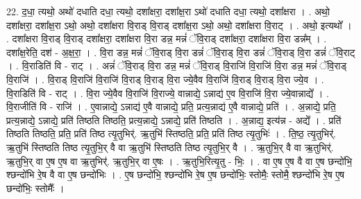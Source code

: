 \documentclass[17pt]{extarticle}
\begin{document}
22. द॒धा॒ त्यथो॒ अथो॑ दधाति दधा॒ त्यथो॒ दशा᳚क्षरा॒ दशा᳚क्ष॒रा ऽथो॑ दधाति दधा॒ त्यथो॒ दशा᳚क्षरा । . अथो॒ दशा᳚क्षरा॒ दशा᳚क्ष॒रा ऽथो॒ अथो॒ दशा᳚क्षरा वि॒राड् वि॒राड् दशा᳚क्ष॒रा ऽथो॒ अथो॒ दशा᳚क्षरा वि॒राट् । . अथो॒ इत्यथो᳚ । . दशा᳚क्षरा वि॒राड् वि॒राड् दशा᳚क्षरा॒ दशा᳚क्षरा वि॒रा डन्न॒ मन्नं॑ ॅवि॒राड् दशा᳚क्षरा॒ दशा᳚क्षरा वि॒रा डन्न᳚म् । . दशा᳚क्ष॒रेति॒ दश॑ - अ॒क्ष॒रा॒ । . वि॒रा डन्न॒ मन्नं॑ ॅवि॒राड् वि॒रा डन्नं॑ ॅवि॒राड् वि॒रा डन्नं॑ ॅवि॒राड् वि॒रा डन्नं॑ ॅवि॒राट् । . वि॒राडिति॑ वि - राट् । . अन्नं॑ ॅवि॒राड् वि॒रा डन्न॒ मन्नं॑ ॅवि॒राड् वि॒राजि॑ वि॒राजि॑ वि॒रा डन्न॒ मन्नं॑ ॅवि॒राड् वि॒राजि॑ । . वि॒राड् वि॒राजि॑ वि॒राजि॑ वि॒राड् वि॒राड् वि॒रा ज्ये॒वैव वि॒राजि॑ वि॒राड् वि॒राड् वि॒रा ज्ये॒व । . वि॒राडिति॑ वि - राट् । . वि॒रा ज्ये॒वैव वि॒राजि॑ वि॒राज्ये॒ वान्नाद्ये॒ ऽन्नाद्य॑ ए॒व वि॒राजि॑ वि॒रा ज्ये॒वान्नाद्ये᳚ । . वि॒राजीति॑ वि - राजि॑ । . ए॒वान्नाद्ये॒ ऽन्नाद्य॑ ए॒वै वान्नाद्ये॒ प्रति॒ प्रत्य॒न्नाद्य॑ ए॒वै वान्नाद्ये॒ प्रति॑ । . अ॒न्नाद्ये॒ प्रति॒ प्रत्य॒न्नाद्ये॒ ऽन्नाद्ये॒ प्रति॑ तिष्ठति तिष्ठति॒ प्रत्य॒न्नाद्ये॒ ऽन्नाद्ये॒ प्रति॑ तिष्ठति । . अ॒न्नाद्य॒ इत्य॑न्न - अद्ये᳚ । . प्रति॑ तिष्ठति तिष्ठति॒ प्रति॒ प्रति॑ तिष्ठ त्यृ॒तुभिर्॑. ऋ॒तुभि॑ स्तिष्ठति॒ प्रति॒ प्रति॑ तिष्ठ त्यृ॒तुभिः॑ । . ति॒ष्ठ॒ त्यृ॒तुभिर्॑. ऋ॒तुभि॑ स्तिष्ठति तिष्ठ त्यृ॒तुभि॒र् वै वा ऋ॒तुभि॑ स्तिष्ठति तिष्ठ त्यृ॒तुभि॒र् वै । . ऋ॒तुभि॒र् वै वा ऋ॒तुभिर्॑. ऋ॒तुभि॒र् वा ए॒ष ए॒ष वा ऋ॒तुभिर्॑. ऋ॒तुभि॒र् वा ए॒षः । . ऋ॒तुभि॒रित्यृ॒तु - भिः॒ । . वा ए॒ष ए॒ष वै वा ए॒ष छन्दो॑भि॒ श्छन्दो॑भि रे॒ष वै वा ए॒ष छन्दो॑भिः । . ए॒ष छन्दो॑भि॒ श्छन्दो॑भि रे॒ष ए॒ष छन्दो॑भिः॒ स्तोमैः॒ स्तोमै॒ श्छन्दो॑भि रे॒ष ए॒ष छन्दो॑भिः॒ स्तोमैः᳚ । \newline
\end{document}
